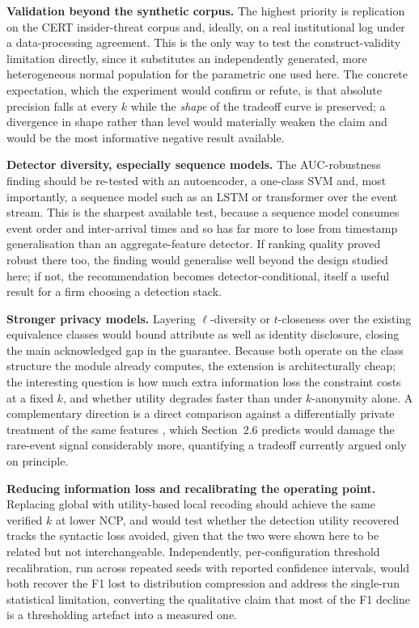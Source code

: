 \documentclass[10pt,a4paper]{article}
\begin{document}
\noindent\textbf{Validation beyond the synthetic corpus.} The highest priority is replication on the CERT insider-threat corpus \cite{glasser2013} and, ideally, on a real institutional log under a data-processing agreement. This is the only way to test the construct-validity limitation directly, since it substitutes an independently generated, more heterogeneous normal population for the parametric one used here. The concrete expectation, which the experiment would confirm or refute, is that absolute precision falls at every $k$ while the \emph{shape} of the tradeoff curve is preserved; a divergence in shape rather than level would materially weaken the claim and would be the most informative negative result available.

\noindent\textbf{Detector diversity, especially sequence models.} The AUC-robustness finding should be re-tested with an autoencoder, a one-class SVM and, most importantly, a sequence model such as an LSTM or transformer over the event stream. This is the sharpest available test, because a sequence model consumes event order and inter-arrival times and so has far more to lose from timestamp generalisation than an aggregate-feature detector. If ranking quality proved robust there too, the finding would generalise well beyond the design studied here; if not, the recommendation becomes detector-conditional, itself a useful result for a firm choosing a detection stack.

\noindent\textbf{Stronger privacy models.} Layering $\ell$-diversity \cite{ldiversity2007} or $t$-closeness \cite{tcloseness2007} over the existing equivalence classes would bound attribute as well as identity disclosure, closing the main acknowledged gap in the guarantee. Because both operate on the class structure the module already computes, the extension is architecturally cheap; the interesting question is how much extra information loss the constraint costs at a fixed $k$, and whether utility degrades faster than under $k$-anonymity alone. A complementary direction is a direct comparison against a differentially private treatment of the same features \cite{dwork2014}, which Section~2.6 predicts would damage the rare-event signal considerably more, quantifying a tradeoff currently argued only on principle.

\noindent\textbf{Reducing information loss and recalibrating the operating point.} Replacing global with utility-based local recoding \cite{xu2006} should achieve the same verified $k$ at lower NCP, and would test whether the detection utility recovered tracks the syntactic loss avoided, given that the two were shown here to be related but not interchangeable. Independently, per-configuration threshold recalibration, run across repeated seeds with reported confidence intervals, would both recover the F1 lost to distribution compression and address the single-run statistical limitation, converting the qualitative claim that most of the F1 decline is a thresholding artefact into a measured one.
\end{document}
